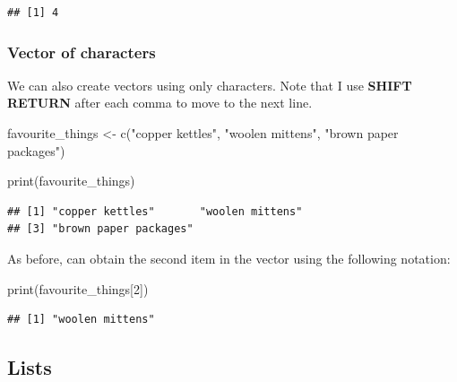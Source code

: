 \documentclass[
]{krantz}
\makeatletter
\newenvironment{Shaded}{\begin{snugshade}}{\end{snugshade}}
\newcommand{\DecValTok}[1]{\textcolor[rgb]{0.06,0.06,0.06}{#1}}
\newcommand{\FunctionTok}[1]{\textcolor[rgb]{0,0,0}{#1}}
\newcommand{\NormalTok}[1]{#1}
\newcommand{\OtherTok}[1]{\textcolor[rgb]{0.37,0.37,0.37}{#1}}
\newcommand{\StringTok}[1]{\textcolor[rgb]{0.5,0.5,0.5}{#1}}
\newenvironment{kframe}{%
\medskip{}
\setlength{\fboxsep}{.8em}
 \def\at@end@of@kframe{}%
 \ifinner\ifhmode%
  \def\at@end@of@kframe{\end{minipage}}%
  \begin{minipage}{\columnwidth}%
 \fi\fi%
 \def\FrameCommand##1{\hskip\@totalleftmargin \hskip-\fboxsep
 \colorbox{shadecolor}{##1}\hskip-\fboxsep
     \hskip-\linewidth \hskip-\@totalleftmargin \hskip\columnwidth}%
 \MakeFramed {\advance\hsize-\width
   \@totalleftmargin\z@ \linewidth\hsize
   \@setminipage}}%
 {\par\unskip\endMakeFramed%
 \at@end@of@kframe}
\renewenvironment{Shaded}{\begin{kframe}}{\end{kframe}}
\makeatother
\begin{document}
\begin{verbatim}
## [1] 4
\end{verbatim}

\hypertarget{vector-of-characters}{%
\subsubsection{Vector of characters}\label{vector-of-characters}}

We can also create vectors using only characters. Note that I use \textbf{SHIFT RETURN} after each comma to move to the next line.

\begin{Shaded}
\begin{Highlighting}[]
\NormalTok{favourite\_things }\OtherTok{\textless{}{-}} \FunctionTok{c}\NormalTok{(}\StringTok{"copper kettles"}\NormalTok{,}
                      \StringTok{"woolen mittens"}\NormalTok{,}
                      \StringTok{"brown paper packages"}\NormalTok{)}
\end{Highlighting}
\end{Shaded}

\begin{Shaded}
\begin{Highlighting}[]
\FunctionTok{print}\NormalTok{(favourite\_things)}
\end{Highlighting}
\end{Shaded}

\begin{verbatim}
## [1] "copper kettles"       "woolen mittens"      
## [3] "brown paper packages"
\end{verbatim}

As before, can obtain the second item in the vector using the following notation:

\begin{Shaded}
\begin{Highlighting}[]
\FunctionTok{print}\NormalTok{(favourite\_things[}\DecValTok{2}\NormalTok{])}
\end{Highlighting}
\end{Shaded}

\begin{verbatim}
## [1] "woolen mittens"
\end{verbatim}

\hypertarget{lists}{%
\subsection{Lists}\label{lists}}
\end{document}
